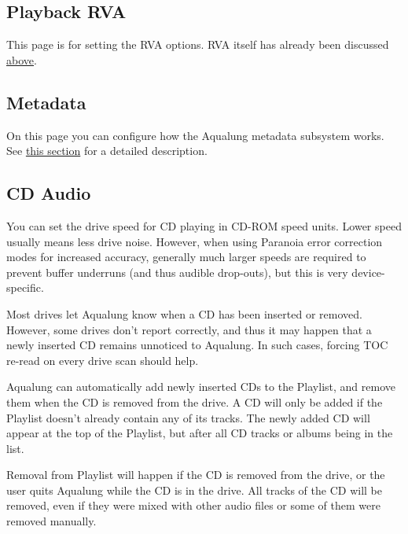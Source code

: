 \documentclass[10pt,english]{article}
\begin{document}
\subsection{Playback RVA\label{idp868720}}



\noindent This page is for setting the RVA options. RVA itself has
already been discussed \hyperref[idp645824]{\color{blue}above}.




\subsection{Metadata\label{idp870640}}



\noindent On this page you can configure how the Aqualung metadata
subsystem works. See \hyperref[idp707312]{\color{blue}this
section} for a detailed description.




\subsection{CD Audio\label{idp872688}}



\noindent You can set the drive speed for CD playing in CD-ROM speed
units. Lower speed usually means less drive noise. However,
when using Paranoia error correction modes for increased
accuracy, generally much larger speeds are required to prevent
buffer underruns (and thus audible drop-outs), but this is
very device-specific.




Most drives let Aqualung know when a CD has been inserted
or removed. However, some drives don't report correctly, and
thus it may happen that a newly inserted CD remains unnoticed
to Aqualung. In such cases, forcing TOC re-read on every drive
scan should help.




Aqualung can automatically add newly inserted CDs to the
Playlist, and remove them when the CD is removed from the
drive. A CD will only be added if the Playlist doesn't already
contain any of its tracks. The newly added CD will appear at
the top of the Playlist, but after all CD tracks or albums
being in the list.




Removal from Playlist will happen if the CD is removed from
the drive, or the user quits Aqualung while the CD is in the
drive. All tracks of the CD will be removed, even if they were
mixed with other audio files or some of them were removed
manually.
\end{document}
